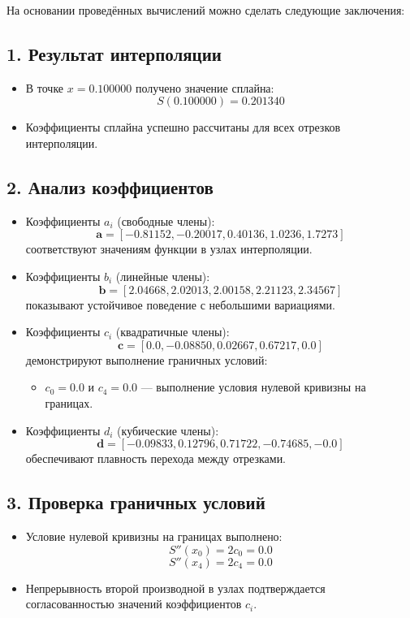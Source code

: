 На основании проведённых вычислений можно сделать следующие заключения:

\subsection*{1. Результат интерполяции}
\begin{itemize}
\item В точке \( x = 0.100000 \) получено значение сплайна:
\[ S(0.100000) = 0.201340 \]
\item Коэффициенты сплайна успешно рассчитаны для всех отрезков интерполяции.
\end{itemize}

\subsection*{2. Анализ коэффициентов}
\begin{itemize}
\item Коэффициенты \( a_i \) (свободные члены):
\[ \mathbf{a} = [-0.81152, -0.20017, 0.40136, 1.0236, 1.7273] \]
соответствуют значениям функции в узлах интерполяции.

\item Коэффициенты \( b_i \) (линейные члены):
\[ \mathbf{b} = [2.04668, 2.02013, 2.00158, 2.21123, 2.34567] \]
показывают устойчивое поведение с небольшими вариациями.

\item Коэффициенты \( c_i \) (квадратичные члены):
\[ \mathbf{c} = [0.0, -0.08850, 0.02667, 0.67217, 0.0] \]
демонстрируют выполнение граничных условий:
\begin{itemize}
\item \( c_0 = 0.0 \) и \( c_4 = 0.0 \) — выполнение условия нулевой кривизны на границах.
\end{itemize}

\item Коэффициенты \( d_i \) (кубические члены):
\[ \mathbf{d} = [-0.09833, 0.12796, 0.71722, -0.74685, -0.0] \]
обеспечивают плавность перехода между отрезками.
\end{itemize}

\subsection*{3. Проверка граничных условий}
\begin{itemize}
\item Условие нулевой кривизны на границах выполнено:
\[ S''(x_0) = 2c_0 = 0.0 \]
\[ S''(x_4) = 2c_4 = 0.0 \]
\item Непрерывность второй производной в узлах подтверждается согласованностью значений коэффициентов \( c_i \).
\end{itemize}

